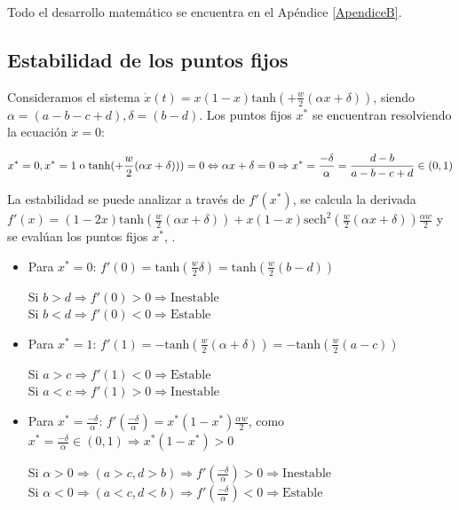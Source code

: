 \documentclass[%
 sor,
 jor,
 amsmath,amssymb,
 reprint,%
]{revtex4-2}
\begin{document}
Todo el desarrollo matemático se encuentra en el Apéndice \ref{ApendiceB}.

\subsection{Estabilidad de los puntos fijos}
\label{estabilidad}

Consideramos el sistema $\dot{x}(t)=x(1-x)\text{tanh}(+\frac{w}{2}(\alpha x+\delta))$, siendo \(\alpha =(a-b-c+d), \delta=(b-d)\). Los puntos fijos $x^*$ se encuentran resolviendo la ecuación $\dot{x}=0$:

\[
x^*=0,x^*=1 \text{\hspace{0,1 cm}o\hspace{0,1 cm}} \text{tanh}(+\frac{w}{2} (\alpha x+\delta)))=0 \Leftrightarrow \alpha x +\delta=0 \Rightarrow x^*=\frac{-\delta}{\alpha}=\frac{d-b}{a-b-c+d} \in (0,1)
\]


La estabilidad se puede analizar a través de $f'(x^*)$, se calcula la derivada $f'(x)=(1-2x)\text{tanh}(\frac{w}{2}(\alpha x +\delta))+x(1-x)\text{sech}^2(\frac{w}{2}(\alpha x +\delta))\frac{\alpha w}{2}$ y se evalúan los puntos fijos $x^*$, \cite{CalvoTema2}.

\begin{itemize}
    \item Para \( x^* = 0 \): \( f'(0) =\text{tanh}(\frac{w}{2}\delta)=\text{tanh}(\frac{w}{2}(b-d))\)

    Si $b>d \Rightarrow f'(0)>0 \Rightarrow \text{Inestable}$\\
    Si $b<d \Rightarrow f'(0)<0 \Rightarrow \text{Estable}$

     \item Para \( x^* = 1 \): \( f'(1) =-\text{tanh}(\frac{w}{2}(\alpha +\delta))=-\text{tanh}(\frac{w}{2}(a-c))\)

    Si $a>c \Rightarrow f'(1)<0 \Rightarrow \text{Estable}$\\
    Si $a<c \Rightarrow f'(1)>0 \Rightarrow \text{Inestable}$

    \item Para \( x^* = \frac{-\delta}{\alpha} \): \( f'(\frac{-\delta}{\alpha}) =x^*(1-x^*)\frac{\alpha w}{2}\), como \(x^*=\frac{-\delta}{\alpha} \in (0,1) \Rightarrow x^*(1-x^*) >0\)

    Si $\alpha>0 \Rightarrow (a>c,d>b) \Rightarrow  f'(\frac{-\delta}{\alpha})>0 \Rightarrow \text{Inestable}$\\
    Si $\alpha<0 \Rightarrow (a<c,d<b) \Rightarrow f'(\frac{-\delta}{\alpha})<0 \Rightarrow \text{Estable}$\\
   
\end{itemize}
\end{document}
